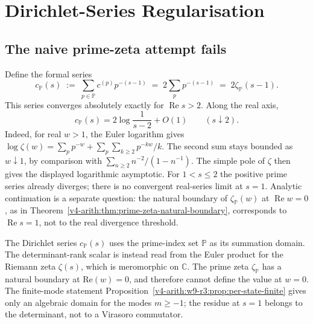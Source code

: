 \section{Dirichlet-Series Regularisation}
\label{v4-arith:w9-r3:dirichlet}

\subsection{The naive prime-zeta attempt fails}
\label{v4-arith:w9-r3:naive-fails}

\begin{observation}
\label{v4-arith:w9-r3:obs:prime-zeta-fails}
Define the formal series
\begin{equation}
\label{v4-arith:w9-r3:eq:c-s-prime-zeta}
c_{\mathbb{P}}(s)\;:=\;\sum_{p\in\mathbb{P}}c^{(p)}p^{-(s-1)}\;=\;2\sum_{p}p^{-(s-1)}\;=\;2\zeta_{\mathbb{P}}(s-1).
\end{equation}
This series converges absolutely exactly for \(\operatorname{Re}s>2\).
Along the real axis,
\[
 c_{\mathbb P}(s)=2\log\frac1{s-2}+O(1)\qquad(s\downarrow2).
\]
Indeed, for real \(w>1\), the Euler logarithm gives
\(\log\zeta(w)=\sum_p p^{-w}+\sum_p\sum_{k\geq2}p^{-kw}/k\).
The second sum stays bounded as \(w\downarrow1\), by comparison
with \(\sum_{n\geq2}n^{-2}/(1-n^{-1})\). The simple pole of
\(\zeta\) then gives the displayed logarithmic asymptotic.
For \(1<s\leq2\) the positive prime series already diverges;
there is no convergent real-series limit at \(s=1\).
Analytic continuation is a separate question: the natural boundary
of \(\zeta_{\mathbb P}(w)\) at \(\operatorname{Re}w=0\), as in
Theorem~\ref{v4-arith:thm:prime-zeta-natural-boundary}, corresponds
to \(\operatorname{Re}s=1\), not to the real divergence threshold.
\end{observation}

\begin{remark}
\label{v4-arith:w9-r3:rem:prime-zeta-error}
The Dirichlet series \(c_{\mathbb{P}}(s)\) uses the prime-index set
\(\mathbb{P}\) as its summation domain. The determinant-rank scalar is
instead read from the Euler product for the Riemann zeta
\(\zeta(s)\), which is meromorphic on \(\mathbb{C}\). The prime zeta
\(\zeta_{\mathbb{P}}\) has a natural boundary at
\(\mathrm{Re}(w)=0\), and therefore cannot define the value at
\(w=0\). The finite-mode statement
Proposition~\ref{v4-arith:w9-r3:prop:per-state-finite} gives only an algebraic
domain for the modes \(m\geq -1\); the residue at \(s=1\) belongs to
the determinant, not to a Virasoro commutator.
\end{remark}

